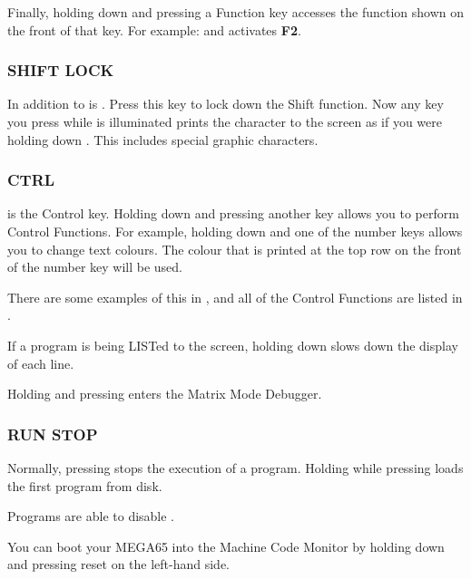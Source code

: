 Finally, holding  down and pressing a Function key accesses the function shown on the front of that key. For example:  and  activates \textbf{F2}.


\subsubsection{SHIFT LOCK}

In addition to  is . Press this key to lock down the Shift function. Now any key you press while  is illuminated prints the character to the screen as if you were holding down . This includes special graphic characters.

\subsubsection{CTRL}

 is the Control key. Holding down  and pressing another key allows you to perform Control Functions. For example, holding down  and one of the number keys allows you to change text colours. The colour that is printed at the top row on the front of the number key will be used.

There are some examples of this in , and all of the Control Functions are listed in .

If a program is being LISTed to the screen, holding down  slows down the display of each line.

Holding  and pressing \megakey{*} enters the Matrix Mode Debugger.

\subsubsection{RUN STOP}

Normally, pressing  stops the execution of a program. Holding  while pressing  loads the first program from disk.

Programs are able to disable .

You can boot your MEGA65 into the Machine Code Monitor by holding down  and pressing reset on the left-hand side.

